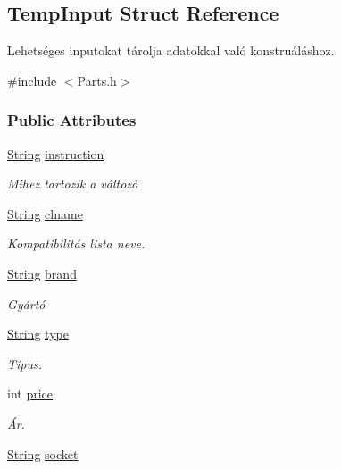 \subsection{Temp\+Input Struct Reference}
\label{struct_temp_input}


Lehetséges inputokat tárolja adatokkal való konstruáláshoz.  




{\ttfamily \#include $<$Parts.\+h$>$}

\subsubsection*{Public Attributes}
\begin{DoxyCompactItemize}
\item 
\mbox{\hyperlink{class_string}{String}} \mbox{\hyperlink{struct_temp_input_a693f4a5b4215b51144174287aecab527}{instruction}}
\begin{DoxyCompactList}\small\item\em Mihez tartozik a változó \end{DoxyCompactList}\item 
\mbox{\hyperlink{class_string}{String}} \mbox{\hyperlink{struct_temp_input_a623b1fe5692319aad5c58cbc42bedf9c}{clname}}
\begin{DoxyCompactList}\small\item\em Kompatibilitás lista neve. \end{DoxyCompactList}\item 
\mbox{\hyperlink{class_string}{String}} \mbox{\hyperlink{struct_temp_input_ae61ec1c3c483e583e4975e5c728e4886}{brand}}
\begin{DoxyCompactList}\small\item\em Gyártó \end{DoxyCompactList}\item 
\mbox{\hyperlink{class_string}{String}} \mbox{\hyperlink{struct_temp_input_a1a73f4b9c84caa8c463a4bad03cf433d}{type}}
\begin{DoxyCompactList}\small\item\em Típus. \end{DoxyCompactList}\item 
int \mbox{\hyperlink{struct_temp_input_a6d049ee814f00b43e1d951317261e357}{price}}
\begin{DoxyCompactList}\small\item\em Ár. \end{DoxyCompactList}\item 
\mbox{\hyperlink{class_string}{String}} \mbox{\hyperlink{struct_temp_input_a5142af446776f87e454134511f681887}{socket}}

\end{DoxyCompactItemize}
